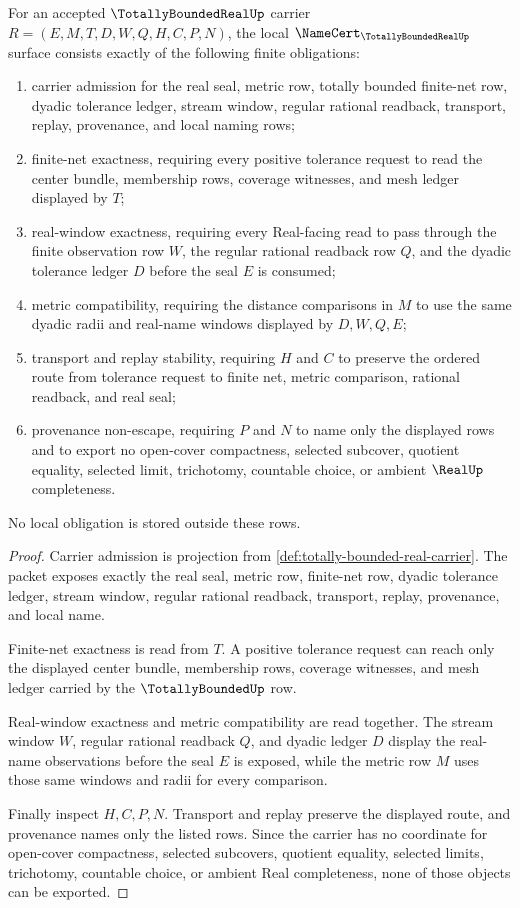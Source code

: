 \begin{theorem}
\label{thm:totally-bounded-real-namecert-obligations}
For an accepted $\TotallyBoundedRealUp$ carrier $R=(E,M,T,D,W,Q,H,C,P,N)$, the local $\NameCert_{\TotallyBoundedRealUp}$ surface consists exactly of the following finite obligations:
\begin{enumerate}
\item carrier admission for the real seal, metric row, totally bounded finite-net row, dyadic tolerance ledger, stream window, regular rational readback, transport, replay, provenance, and local naming rows;
\item finite-net exactness, requiring every positive tolerance request to read the center bundle, membership rows, coverage witnesses, and mesh ledger displayed by $T$;
\item real-window exactness, requiring every Real-facing read to pass through the finite observation row $W$, the regular rational readback row $Q$, and the dyadic tolerance ledger $D$ before the seal $E$ is consumed;
\item metric compatibility, requiring the distance comparisons in $M$ to use the same dyadic radii and real-name windows displayed by $D,W,Q,E$;
\item transport and replay stability, requiring $H$ and $C$ to preserve the ordered route from tolerance request to finite net, metric comparison, rational readback, and real seal;
\item provenance non-escape, requiring $P$ and $N$ to name only the displayed rows and to export no open-cover compactness, selected subcover, quotient equality, selected limit, trichotomy, countable choice, or ambient $\RealUp$ completeness.
\end{enumerate}
No local obligation is stored outside these rows.
\end{theorem}
\begin{proof}
Carrier admission is projection from \autoref{def:totally-bounded-real-carrier}. The packet exposes exactly the real seal, metric row, finite-net row, dyadic tolerance ledger, stream window, regular rational readback, transport, replay, provenance, and local name.

Finite-net exactness is read from $T$. A positive tolerance request can reach only the displayed center bundle, membership rows, coverage witnesses, and mesh ledger carried by the $\TotallyBoundedUp$ row.

Real-window exactness and metric compatibility are read together. The stream window $W$, regular rational readback $Q$, and dyadic ledger $D$ display the real-name observations before the seal $E$ is exposed, while the metric row $M$ uses those same windows and radii for every comparison.

Finally inspect $H,C,P,N$. Transport and replay preserve the displayed route, and provenance names only the listed rows. Since the carrier has no coordinate for open-cover compactness, selected subcovers, quotient equality, selected limits, trichotomy, countable choice, or ambient Real completeness, none of those objects can be exported.
\end{proof}

